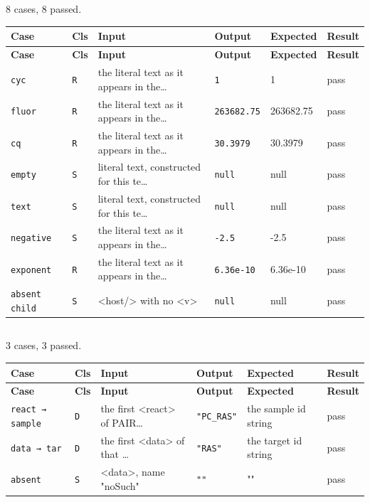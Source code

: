 \subsection*{}
{\small 8 cases, 8 passed.}\par
{\small
\begin{xltabular}{\linewidth}{|X|l|l|l|l|l|}
\toprule \textbf{Case} & \textbf{Cls} & \textbf{Input} & \textbf{Output} & \textbf{Expected} & \textbf{Result} \\\midrule\endfirsthead
\toprule \textbf{Case} & \textbf{Cls} & \textbf{Input} & \textbf{Output} & \textbf{Expected} & \textbf{Result} \\\midrule\endhead
\texttt{cyc} & \texttt{R} & the literal text as it appears in the… & \texttt{1} & 1 & pass \\
\texttt{fluor} & \texttt{R} & the literal text as it appears in the… & \texttt{263682.75} & 263682.75 & pass \\
\texttt{cq} & \texttt{R} & the literal text as it appears in the… & \texttt{30.3979} & 30.3979 & pass \\
\texttt{empty} & \texttt{S} & literal text, constructed for this te… & \texttt{null} & null & pass \\
\texttt{text} & \texttt{S} & literal text, constructed for this te… & \texttt{null} & null & pass \\
\texttt{negative} & \texttt{S} & the literal text as it appears in the… & \texttt{-2.5} & -2.5 & pass \\
\texttt{exponent} & \texttt{R} & the literal text as it appears in the… & \texttt{6.36e-10} & 6.36e-10 & pass \\
\texttt{absent child} & \texttt{S} & <host/> with no <v> & \texttt{null} & null & pass \\
\bottomrule
\end{xltabular}}

\subsection*{}
{\small 3 cases, 3 passed.}\par
{\small
\begin{xltabular}{\linewidth}{|X|l|l|l|l|l|}
\toprule \textbf{Case} & \textbf{Cls} & \textbf{Input} & \textbf{Output} & \textbf{Expected} & \textbf{Result} \\\midrule\endfirsthead
\toprule \textbf{Case} & \textbf{Cls} & \textbf{Input} & \textbf{Output} & \textbf{Expected} & \textbf{Result} \\\midrule\endhead
\texttt{react → sample} & \texttt{D} & the first <react> of PAIR… & \texttt{"PC\_RAS"} & the sample id string & pass \\
\texttt{data → tar} & \texttt{D} & the first <data> of that … & \texttt{"RAS"} & the target id string & pass \\
\texttt{absent} & \texttt{S} & <data>, name "noSuch" & \texttt{""} & "" & pass \\
\bottomrule
\end{xltabular}}

